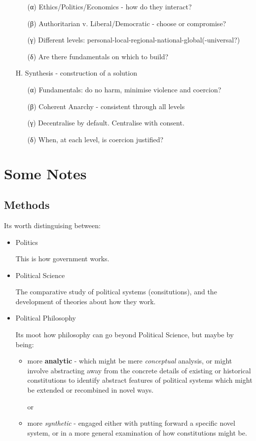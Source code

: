\documentclass[14pt,titlepage]{extarticle}
\begin{document}
\begin{itemize}
\begin{itemize}
  \item[(α)] Ethics/Politics/Economics - how do they interact?
  \item[(β)] Authoritarian v. Liberal/Democratic  - choose or compromise? 
  \item[(γ)] Different levels: personal-local-regional-national-global(-universal?) 
  \item[(δ)] Are there fundamentals on which to build?
  \end{itemize}
\item[Η.] Synthesis - construction of a solution
  \begin{itemize}
  \item[(α)] Fundamentals: do no harm, minimise violence and coercion?
  \item[(β)] Coherent Anarchy - consistent through all levels
  \item[(γ)] Decentralise by default. Centralise with consent.
  \item[(δ)] When, at each level, is coercion justified?
  \end{itemize}
\end{itemize}

\pagebreak


\section{Some Notes}

\subsection{Methods}

Its worth distinguising between:
\begin{itemize}
\item Politics

  This is how government works.
  
\item Political Science

The comparative study of political systems (consitutions), and the development of theories about how they work.
  
\item Political Philosophy

  Its moot how philosophy can go beyond Political Science, but maybe by being:
  
  \begin{itemize}
  \item more {\bf analytic} - which might be mere \emph{conceptual} analysis, or might involve abstracting away from the concrete details of existing or historical constitutions to identify abstract features of political systems which might be extended or recombined in novel ways.

    or
    \item more {\it synthetic} - engaged either with putting forward a specific novel system, or in a more general examination of how constitutions might be.
  \end{itemize}

\end {itemize}
\end{document}
